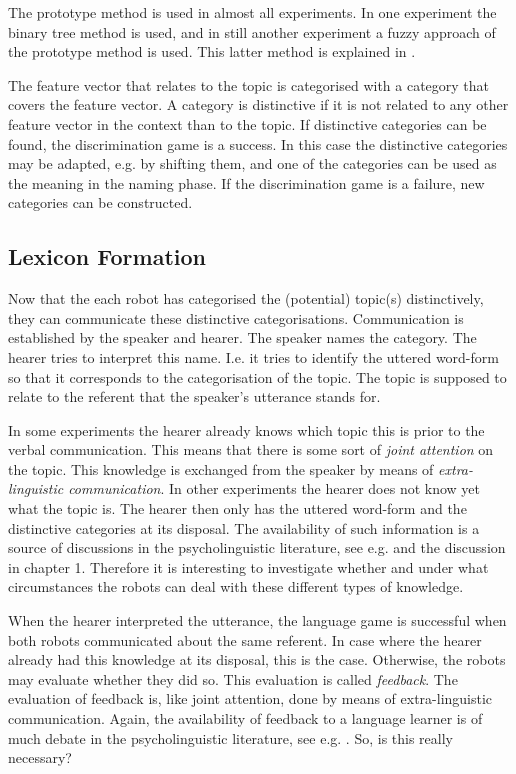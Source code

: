 The prototype method is used in almost all experiments. In one experiment the binary tree method is used, and in still another experiment a fuzzy approach of the prototype method is used. This latter method is explained in .

The feature vector that relates to the topic is categorised with a category that covers the feature vector. A category is distinctive if it is not related to any other feature vector in the context than to the topic. If distinctive categories can be found, the discrimination game is a success. In this case the distinctive categories may be adapted, e.g. by shifting them, and one of the categories can be used as the meaning in the naming phase. If the discrimination game is a failure, new categories can be constructed.

\subsection{Lexicon Formation}\label{s:cm:ng}

Now that the each robot has categorised the (potential) topic(s) distinctively, they can communicate these distinctive categorisations. Communication is established by the speaker and hearer. The speaker names the category. The hearer tries to interpret this name. I.e. it tries to identify the uttered word-form so that it corresponds to the categorisation of the topic. The topic is supposed to relate to the referent that the speaker's utterance stands for. 

In some experiments the hearer already knows which topic this is prior to the verbal communication. This means that there is some sort of {\em joint attention} on the topic. This knowledge is exchanged from the speaker by means of {\em extra-linguistic communication}. In other experiments the hearer does not know yet what the topic is. The hearer then only has the uttered word-form and the distinctive categories at its disposal. The availability of such information is a source of discussions in the psycholinguistic literature, see e.g. \citep{barrett:1995} and the discussion in chapter 1. Therefore it is interesting to investigate whether and under what circumstances the robots can deal with these different types of knowledge.

When the hearer interpreted the utterance, the language game is successful when both robots communicated about the same referent. In case where the hearer already had this knowledge at its disposal, this is the case. Otherwise, the robots may evaluate whether they did so. This evaluation is called {\em feedback}. The evaluation of feedback is, like joint attention, done by means of extra-linguistic communication. Again, the availability of feedback to a language learner is of much debate in the psycholinguistic literature, see e.g. \citep{bowerman:1988}. So, is this really necessary? 

